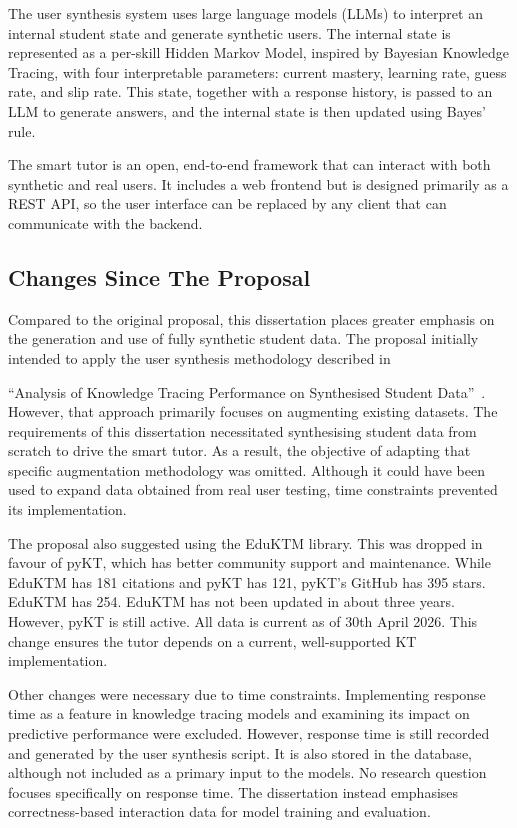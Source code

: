 The user synthesis system uses large language models (LLMs) to interpret an internal student state and generate synthetic users. The internal state is represented as a per-skill Hidden Markov Model, inspired by Bayesian Knowledge Tracing, with four interpretable parameters: current mastery, learning rate, guess rate, and slip rate. This state, together with a response history, is passed to an LLM to generate answers, and the internal state is then updated using Bayes' rule.

The smart tutor is an open, end-to-end framework that can interact with both synthetic and real users. It includes a web frontend but is designed primarily as a REST API, so the user interface can be replaced by any client that can communicate with the backend.

\subsection{Changes Since The Proposal}

Compared to the original proposal, this dissertation places greater emphasis on the generation and use of fully synthetic student data. The proposal initially intended to apply the user synthesis methodology described in

``Analysis of Knowledge Tracing Performance on Synthesised Student Data''~\autocite{pagonis2024studentsynthesis}. However, that approach primarily focuses on augmenting existing datasets. The requirements of this dissertation necessitated synthesising student data from scratch to drive the smart tutor. As a result, the objective of adapting that specific augmentation methodology was omitted. Although it could have been used to expand data obtained from real user testing, time constraints prevented its implementation.

The proposal also suggested using the EduKTM library. This was dropped in favour of pyKT, which has better community support and maintenance. While EduKTM has 181 citations and pyKT has 121, pyKT's GitHub has 395 stars. EduKTM has 254. EduKTM has not been updated in about three years. However, pyKT is still active. All data is current as of 30th April 2026. This change ensures the tutor depends on a current, well-supported KT implementation.

Other changes were necessary due to time constraints. Implementing response time as a feature in knowledge tracing models and examining its impact on predictive performance were excluded. However, response time is still recorded and generated by the user synthesis script. It is also stored in the database, although not included as a primary input to the models. No research question focuses specifically on response time. The dissertation instead emphasises correctness-based interaction data for model training and evaluation.


